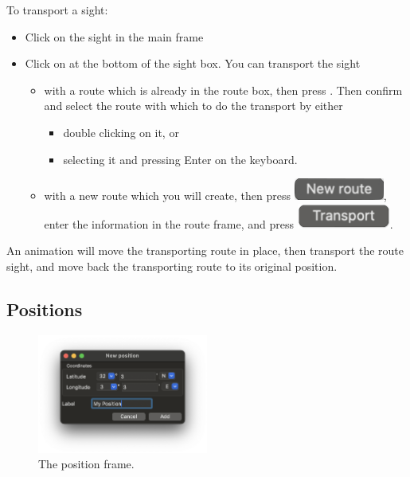 \documentclass{ol-softwaremanual}
\begin{document}
To transport a sight: 
\begin{itemize}
\item Click on the sight in the main frame
\item Click on  at the bottom of the sight box. You can transport the sight
\begin{itemize}
\item with a route which is already in the route box, then press . Then confirm and select the route with which to do the transport by either
\begin{itemize}
  \item double clicking on it, or
  \item selecting it and pressing Enter on the keyboard. 
\end{itemize}
\item with a new route which you will create, then press \includegraphics{figures/new-route-button.png}, enter the information in the route frame, and press \includegraphics{figures/routeframe-transport-button.png}. 
\end{itemize}
\end{itemize}
An animation will move the transporting route in place, then transport the route sight, and move back the transporting route to its original position. 


\subsection{Positions}\label{section-position}

\begin{figure}
  \includegraphics[width=0.5\textwidth]{figures/position-frame.png}
  \caption{
    \label{fig-position-frame}
    The position frame.  
  }
\end{figure}
\end{document}
